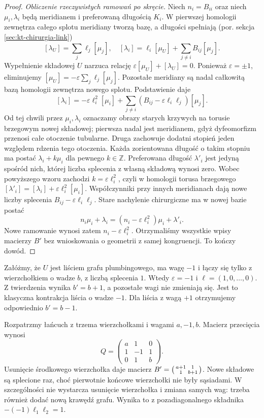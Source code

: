 \begin{proof}
\emph{Obliczenie rzeczywistych ramowań po skręcie.}
Niech $n_i=B_{ii}$ oraz niech $\mu_i,\lambda_i$
będą meridianem i preferowaną długością $K_i$.
W pierwszej homologii zewnętrza całego splotu
meridiany tworzą bazę, a długości spełniają
(por. sekcja \ref{sec:kt-chirurgia-link})
\[
[\lambda_U]=\sum_j\ell_j[\mu_j],
\quad
[\lambda_i]=\ell_i[\mu_U]+
\sum_{j\ne i}B_{ij}[\mu_j].
\]
Wypełnienie składowej $U$ narzuca relację
$\varepsilon[\mu_U]+[\lambda_U]=0$.
Ponieważ $\varepsilon=\pm1$, eliminujemy
$[\mu_U]=-\varepsilon\sum_j\ell_j[\mu_j]$.
Pozostałe meridiany są nadal całkowitą bazą
homologii zewnętrza nowego splotu. Podstawienie daje
\[
[\lambda_i]=-\varepsilon\ell_i^2[\mu_i]
+\sum_{j\ne i}(B_{ij}-\varepsilon\ell_i\ell_j)[\mu_j].
\]
Od tej chwili przez $\mu_i,\lambda_i$ oznaczamy
obrazy starych krzywych na torusie brzegowym
nowej składowej; pierwsza nadal jest meridianem,
gdyż dyfeomorfizm przenosi całe otoczenie tubularne.
Druga zachowuje dodatni stopień jeden względem
rdzenia tego otoczenia. Każda zorientowana długość
o takim stopniu ma postać $\lambda_i+k\mu_i$
dla pewnego $k\in\mathbb Z$. Preferowana długość
$\lambda'_i$ jest jedyną spośród nich, której
liczba splecenia z własną składową wynosi zero.
Wobec powyższego wzoru zachodzi
$k=\varepsilon\ell_i^2$, czyli w homologii torusa
brzegowego
$[\lambda'_i]=[\lambda_i]+\varepsilon\ell_i^2[\mu_i]$.
Współczynniki przy innych meridianach dają
nowe liczby splecenia $B_{ij}-\varepsilon\ell_i\ell_j$.
Stare nachylenie chirurgiczne ma w nowej bazie postać
\[
n_i\mu_i+\lambda_i
=(n_i-\varepsilon\ell_i^2)\mu_i+\lambda'_i.
\]
Nowe ramowanie wynosi zatem
$n_i-\varepsilon\ell_i^2$.
Otrzymaliśmy wszystkie wpisy macierzy $B'$
bez wnioskowania o geometrii z samej kongruencji.
To kończy dowód.
\end{proof}

\begin{przyklad}
Załóżmy, że $U$ jest liściem grafu plumbingowego,
ma wagę $-1$ i łączy się tylko z wierzchołkiem
o wadze $b$, z liczbą splecenia $1$.
Wtedy $\varepsilon=-1$ i $\ell=(1,0,\ldots,0)$.
Z twierdzenia wynika $b'=b+1$, a pozostałe wagi
nie zmieniają się. Jest to klasyczna kontrakcja
liścia o wadze $-1$. Dla liścia z wagą $+1$
otrzymujemy odpowiednio $b'=b-1$.
\end{przyklad}

\begin{przyklad}
Rozpatrzmy łańcuch z trzema wierzchołkami i wagami
$a,-1,b$. Macierz przecięcia wynosi
\[
Q=\begin{pmatrix}a&1&0\\1&-1&1\\0&1&b\end{pmatrix}.
\]
Usunięcie środkowego wierzchołka daje macierz
$B'=\begin{psmallmatrix}a+1&1\\1&b+1\end{psmallmatrix}$.
Nowe składowe są splecione raz, choć pierwotnie
końcowe wierzchołki nie były sąsiadami.
W szczególności nie wystarcza usunięcie wierzchołka
i zmiana samych wag: trzeba również dodać nową
krawędź grafu. Wynika to z pozadiagonalnego składnika
$-(-1)\ell_1\ell_2=1$.
\end{przyklad}

